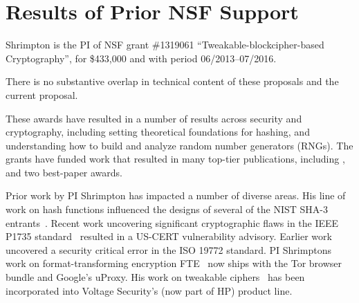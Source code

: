 \section{Results of Prior NSF Support}
\label{sec:prior}


Shrimpton is the PI of NSF grant \#1319061 
``Tweakable-blockcipher-based Cryptography'', for \$433,000 and with
period 06/2013--07/2016. 

There is no substantive overlap in technical
content of these proposals and the current proposal.

 These awards have resulted in a number of results
across security and cryptography, including setting theoretical foundations for
hashing, and understanding how
to build and analyze random number generators (RNGs). The grants have funded work that
resulted in many top-tier publications, including
\cite{DRS09,BCS-journal09,OSS,BRSS10,fischlin2010random,RSS,PRS11,dyer2012peek,clrw,tct,Dyer-2013,luchaup2014libfte,luchaup2014formatted},
and two best-paper awards. 

  Prior work by PI Shrimpton has impacted a
number of diverse areas.  His line of work on hash functions influenced the designs of several of the NIST
SHA-3 entrants~\cite{DRS09,BCS-journal09,BRSS10,RSS}.  
%
Recent work uncovering significant cryptographic flaws in the IEEE
P1735 standard~\cite{CNS+17} resulted in a US-CERT vulnerability
advisory.  Earlier work~\cite{NPS} uncovered a security critical error
in the ISO 19772 standard.
%
PI Shrimptons work on format-transforming encryption FTE~\cite{Dyer-2013,luchaup2014libfte,luchaup2014formatted}
now ships with the Tor browser bundle and Google's uProxy. 
%
His work on tweakable ciphers~\cite{tct} has been incorporated into
Voltage Security's (now part of HP) product line.






